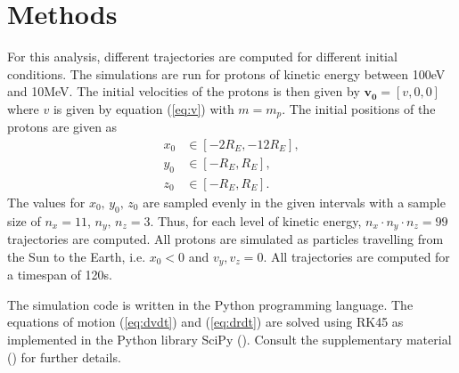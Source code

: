 \section{Methods}
For this analysis, different trajectories are computed for different initial conditions. 
The simulations are run for protons of kinetic energy between 100eV and 10MeV.
The initial velocities of the protons is then given by $\bm{v_0} = [v,0,0]$ where $v$ is given by equation (\ref{eq:v}) with $m=m_p$.
The initial positions of the protons are given as
\begin{align*}
    x_0 &\in [-2R_E, -12R_E], \\
    y_0 &\in [-R_E, R_E], \\
    z_0 &\in [-R_E,R_E].  
\end{align*}
The values for $x_0,\,y_0,\,z_0$ are sampled evenly in the given intervals with a sample size of $n_x=11$, $n_y,\,n_z = 3$. 
Thus, for each level of kinetic energy, $n_x \cdot n_y \cdot n_z = 99$ trajectories are computed.
All protons are simulated as particles travelling from the Sun to the Earth, i.e. $x_0 < 0$ and $v_y, v_z = 0$.
All trajectories are computed for a timespan of 120s. 

The simulation code is written in the Python programming language. 
The equations of motion (\ref{eq:dvdt}) and (\ref{eq:drdt}) are solved using RK45 as implemented in the Python library SciPy (\cite{scipy_ivp}).
Consult the supplementary material (\cite{supplementary}) for further details.  
